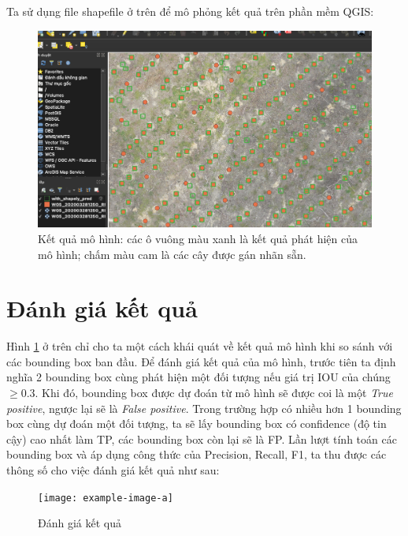 \documentclass[a4paper, 12pt]{report}
\begin{document}
Ta sử dụng file shapefile ở trên để mô phỏng kết quả trên phần mềm QGIS:
 \begin{figure}[!h]
	\centering
	\includegraphics[width=1\linewidth]{Images/demo_result}
	\caption{Kết quả mô hình: các ô vuông màu xanh là kết quả phát hiện của mô hình; chấm màu cam là các cây được gán nhãn sẵn. }
	\label{fig:demo_result}
\end{figure}


\section{Đánh giá kết quả}
Hình \ref{fig:demo_result} ở trên chỉ cho ta một cách khái quát về kết quả mô hình khi so sánh với các bounding box ban đầu.  Để đánh giá kết quả của mô hình,  trước tiên ta định nghĩa 2 bounding box cùng phát hiện một đối tượng nếu giá trị IOU của chúng $\geq 0.3$. Khi đó,  bounding box được dự đoán từ mô hình sẽ được coi là một \textit{True positive},  ngược lại sẽ là \textit{False positive}.  Trong trường hợp có nhiều hơn 1 bounding box cùng dự đoán một đối tượng,  ta sẽ lấy bounding box có confidence (độ tin cậy) cao nhất làm TP, các bounding box còn lại sẽ là FP.  Lần lượt tính toán các bounding box và áp dụng công thức của Precision,  Recall,  F1,  ta thu được các thông số cho việc đánh giá kết quả như sau: 
\begin{figure}[!h]
	\centering
  	\texttt{[image: example-image-a]}
 	 \caption{Đánh giá kết quả}
 	 \label{fig:sub1}
\end{figure}
\end{document}
